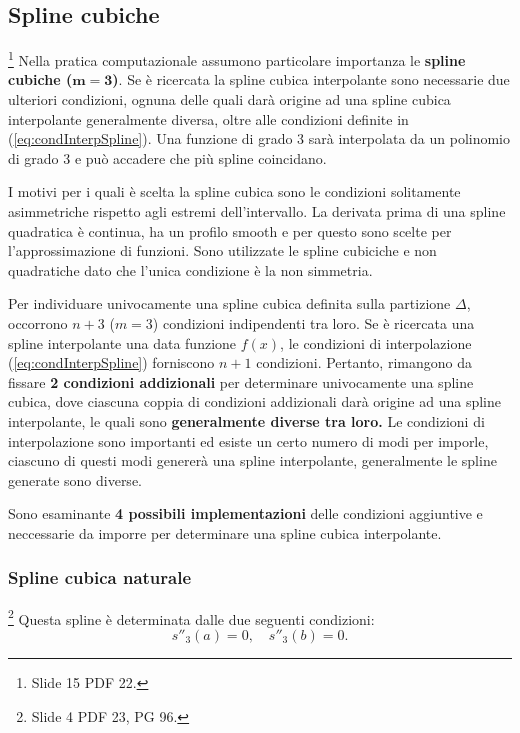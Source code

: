 \subsection{Spline cubiche}
\begin{remark}
    \footnote{Slide 15 PDF 22.}
    Nella pratica computazionale assumono particolare importanza le \textbf{spline cubiche ($\boldsymbol{m=3}$)}. Se è ricercata la spline cubica interpolante sono necessarie due ulteriori condizioni, ognuna delle quali darà origine ad una spline cubica interpolante generalmente diversa, oltre alle condizioni definite in (\ref{eq:condInterpSpline}). Una funzione di grado 3 sarà interpolata da un polinomio di grado 3 e può accadere che più spline coincidano.
\end{remark}

I motivi per i quali è scelta la spline cubica sono le condizioni solitamente asimmetriche rispetto agli estremi dell'intervallo. La derivata prima di una spline quadratica è continua, ha un profilo smooth e per questo sono scelte per l'approssimazione di funzioni. Sono utilizzate le spline cubiciche e non quadratiche dato che l'unica condizione è la non simmetria.

Per individuare univocamente una spline cubica definita sulla partizione $\Delta$, occorrono $n+3$ ($m=3$) condizioni indipendenti tra loro. Se è ricercata una spline interpolante una data funzione $f(x)$, le condizioni di interpolazione (\ref{eq:condInterpSpline}) forniscono $n+1$ condizioni. Pertanto, rimangono da fissare \textbf{2 condizioni addizionali} per determinare univocamente una spline cubica, dove ciascuna coppia di condizioni addizionali darà origine ad una spline interpolante, le quali sono \textbf{generalmente diverse tra loro.} Le condizioni di interpolazione sono importanti ed esiste un certo numero di modi per imporle, ciascuno di questi modi genererà una spline interpolante, generalmente le spline generate sono diverse.

Sono esaminante \textbf{4 possibili implementazioni} delle condizioni aggiuntive e neccessarie da imporre per determinare una spline cubica interpolante.
\subsubsection{Spline cubica naturale}
\footnote{Slide 4 PDF 23, PG 96.} 
Questa spline è determinata dalle due seguenti condizioni:
\begin{equation}\label{eq:condSplineCubNat}
    \boxed{s''_3(a)=0,\quad s''_3(b)=0.}
\end{equation}

